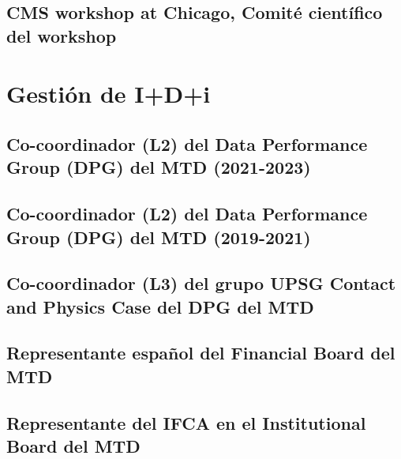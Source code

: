 \documentclass[a4paper, 11pt, twoside, openright]{report}
\begin{document}
\subsection{CMS workshop at Chicago, Comité científico del workshop}



\section{Gestión de I+D+i}

\subsection{Co-coordinador (L2) del Data Performance Group (DPG) del MTD (2021-2023)}


\subsection{Co-coordinador (L2) del Data Performance Group (DPG) del MTD (2019-2021)}


\subsection{Co-coordinador (L3) del grupo UPSG Contact and Physics Case del DPG del MTD}


\subsection{Representante español del Financial Board del MTD}


\subsection{Representante del IFCA en el Institutional Board del MTD}

\end{document}
